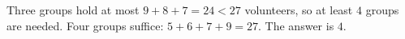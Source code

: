Three groups hold at most $9+8+7=24<27$ volunteers, so at least $4$ groups are needed. Four groups suffice: $5+6+7+9=27$. The answer is $\boxed{4}$.
